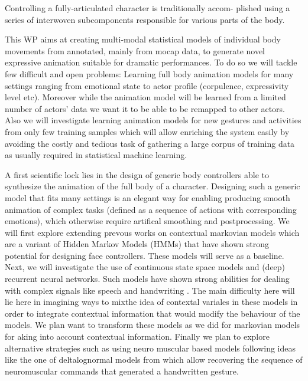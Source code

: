 Controlling a fully-articulated character is traditionally accom-
plished using a series of interwoven subcomponents responsible
for various parts of the body. 


This WP aims at creating multi-modal statistical models of individual body movements from annotated, mainly from mocap data, to generate novel expressive animation suitable for dramatic performances. 
To do so we will tackle few difficult and open problems: Learning full body animation models for many settings ranging from emotional state to actor profile (corpulence, expressivity level etc). 
Moreover while the animation model will be learned from a limited number of actors' data we want it to be able to be remapped to other actors. 
Also we will investigate learning animation models for new gestures and activities from only few training samples which will allow enriching the system easily by avoiding the costly and tedious task of gathering a large corpus of training data as
usually required in statistical machine learning.



A first scientific lock lies in the design of generic body controllers able to synthesize the animation of the full body of a character. 
Designing such a generic model that fits many settings is an elegant way for enabling producing smooth animation of complex tasks (defined as a sequence of actions with corresponding emotions), which otherwise require artifical smoothing and postprocessing. We will first explore extending prevous works on contextual markovian models \cite{Radenen2014, Ding2013, Ding2014} which are a variant of Hidden Markov Models (HMMs) that have shown strong potential for designing face controllers. These models will serve as a baseline. 
Next, we will investigate the use of continuous state space models and (deep) recurrent neural networks. Such models have shown strong abilities for dealing with complex signals like speech and handwriting \cite{DBLP:journals/corr/Graves13}. 
The main difficulty here will lie here in imagining ways to mixthe idea of contextal variales in these models in order to integrate contextual information that would modify the behaviour of the models. 
We plan want to transform these models as we did for markovian models for aking into account contextual information. 
Finally we plan to explore alternative strategies such as using neuro muscular based models following ideas like the one of deltalognormal models from \cite{DBLP:conf/icfhr/FischerPOS14,} which allow recovering the sequence of neuromuscular commands that generated a handwritten gesture. 

